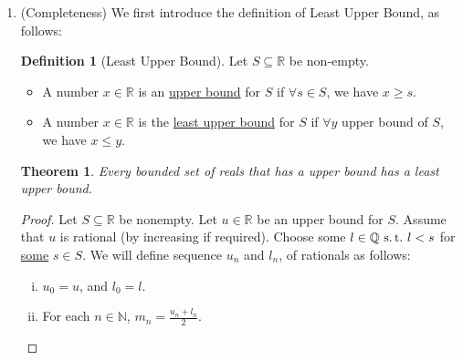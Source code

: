 \documentclass[12pt]{amsart}
\newcommand{\bbR}{\mathbb{R}}
\newcommand{\bbN}{\mathbb{N}}
\newcommand{\bbQ}{\mathbb{Q}}
\newcommand{\suchthat}{\operatorname{\thinspace s.t. \thinspace}}
\theoremstyle{plain}
\newtheorem*{thm}{Theorem}
\theoremstyle{remark}
\theoremstyle{definition}
\newtheorem*{define}{Definition}
\begin{document}
\begin{enumerate}[(1)]
		\item (Completeness)
			We first introduce the definition of Least Upper Bound, as follows: 
			\begin{define}[Least Upper Bound]
				Let $S \subseteq \bbR$ be non-empty. 
				\begin{itemize}[ ]
					\item A number $x\in \bbR$ is an \ul{upper bound} for $S$ if $\forall s\in S$, we have $x \geqslant s$.
					\item A number $x\in \bbR$ is the \ul{least upper bound} for $S$ if $\forall y$ upper bound of $S$, we have $x \leqslant y$.
				\end{itemize}
			\end{define}
		\begin{thm}
			Every bounded set of reals that has a upper bound has a least upper bound.
		\end{thm}
		\begin{proof}
			Let $S \subseteq \bbR$ be nonempty. Let $u\in \bbR$ be an upper bound for $S$. Assume that $u$ is rational (by increasing if required). Choose some $l \in \bbQ \suchthat l < s$ for \ul{some} $s \in S$. We will define sequence $u_n$ and $l_n$, of rationals as follows:
			\begin{enumerate}[(i)]
				\item 
					$u_0 = u$, and $l_0 = l$.
				\item
					For each $n \in \bbN$, $m_n = \displaystyle \frac{u_n + l_n}{2}$.
					

\end{enumerate}
\end{proof}
\end{enumerate}
\end{document}
